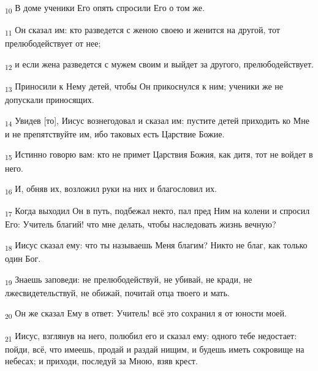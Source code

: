 \begin{tcolorbox}
\textsubscript{10} В доме ученики Его опять спросили Его о том же.
\end{tcolorbox}
\begin{tcolorbox}
\textsubscript{11} Он сказал им: кто разведется с женою своею и женится на другой, тот прелюбодействует от нее;
\end{tcolorbox}
\begin{tcolorbox}
\textsubscript{12} и если жена разведется с мужем своим и выйдет за другого, прелюбодействует.
\end{tcolorbox}
\begin{tcolorbox}
\textsubscript{13} Приносили к Нему детей, чтобы Он прикоснулся к ним; ученики же не допускали приносящих.
\end{tcolorbox}
\begin{tcolorbox}
\textsubscript{14} Увидев [то], Иисус вознегодовал и сказал им: пустите детей приходить ко Мне и не препятствуйте им, ибо таковых есть Царствие Божие.
\end{tcolorbox}
\begin{tcolorbox}
\textsubscript{15} Истинно говорю вам: кто не примет Царствия Божия, как дитя, тот не войдет в него.
\end{tcolorbox}
\begin{tcolorbox}
\textsubscript{16} И, обняв их, возложил руки на них и благословил их.
\end{tcolorbox}
\begin{tcolorbox}
\textsubscript{17} Когда выходил Он в путь, подбежал некто, пал пред Ним на колени и спросил Его: Учитель благий! что мне делать, чтобы наследовать жизнь вечную?
\end{tcolorbox}
\begin{tcolorbox}
\textsubscript{18} Иисус сказал ему: что ты называешь Меня благим? Никто не благ, как только один Бог.
\end{tcolorbox}
\begin{tcolorbox}
\textsubscript{19} Знаешь заповеди: не прелюбодействуй, не убивай, не кради, не лжесвидетельствуй, не обижай, почитай отца твоего и мать.
\end{tcolorbox}
\begin{tcolorbox}
\textsubscript{20} Он же сказал Ему в ответ: Учитель! всё это сохранил я от юности моей.
\end{tcolorbox}
\begin{tcolorbox}
\textsubscript{21} Иисус, взглянув на него, полюбил его и сказал ему: одного тебе недостает: пойди, всё, что имеешь, продай и раздай нищим, и будешь иметь сокровище на небесах; и приходи, последуй за Мною, взяв крест.
\end{tcolorbox}
